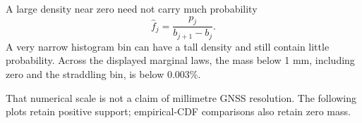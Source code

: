 \documentclass[11pt,aspectratio=169]{beamer}
\begin{document}
\begin{frame}{A large density near zero need not carry much probability}
\[
 \widehat f_j=\frac{p_j}{b_{j+1}-b_j}.
\]
\small A very narrow histogram bin can have a tall density and still contain
little probability. Across the displayed marginal laws, the mass below 1 mm,
including zero and the straddling bin, is below $0.003\%$.
\par\medskip
That numerical scale is not a claim of millimetre GNSS resolution.
The following plots retain positive support; empirical-CDF comparisons also retain zero mass.
\end{frame}
\end{document}
